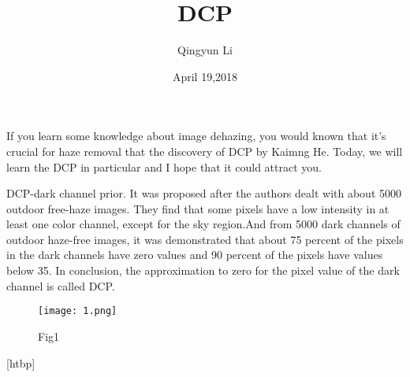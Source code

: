 \documentclass{article}
\author{Qingyun Li}
\date{April 19,2018}
\title{DCP}
\begin{document}
\maketitle
 \par If you learn some knowledge about image dehazing, you would known that it's crucial for haze removal that the discovery of DCP by Kaimng He. Today, we will learn the DCP in particular and I hope that it could attract you.
 \par DCP-dark channel prior. It was proposed after the authors dealt with about 5000 outdoor free-haze images. They find that some pixels have a low intensity in at least one color channel, except for the sky region.And from 5000 dark channels of outdoor haze-free images, it was demonstrated that about 75 percent of the pixels in the dark channels have zero values and 90 percent of the pixels have values below 35. In conclusion, the approximation to zero for the pixel value of the dark channel is called DCP.
\begin{figure}[htbp]
\centering{}
\texttt{[image: 1.png]}
\caption{Fig1} \label{Fig1}
\end{figure}[htbp]
\end{document}
